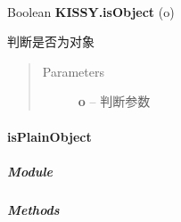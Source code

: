 \documentclass[letterpaper,10pt,english]{sphinxmanual}
\begin{document}
\begin{fulllineitems}
\label{api/seed/lang/isObject:Lang.KISSY.isObject}~
\begin{DUlineblock}{0em}
\item[] Boolean \textbf{KISSY.isObject} (o)
\item[] 判断是否为对象
\end{DUlineblock}
\begin{quote}\begin{description}
\item[{Parameters}] \leavevmode
\textbf{o} -- 判断参数

\end{description}\end{quote}

\end{fulllineitems}



\paragraph{isPlainObject}
\label{api/seed/lang/isPlainObject:isplainobject}\label{api/seed/lang/isPlainObject::doc}

\subparagraph{Module}
\label{api/seed/lang/isPlainObject:module}\begin{quote}

{\hyperref[api/seed/lang/index:module-Lang]{}}
\end{quote}


\subparagraph{Methods}
\label{api/seed/lang/isPlainObject:methods}
\end{document}
